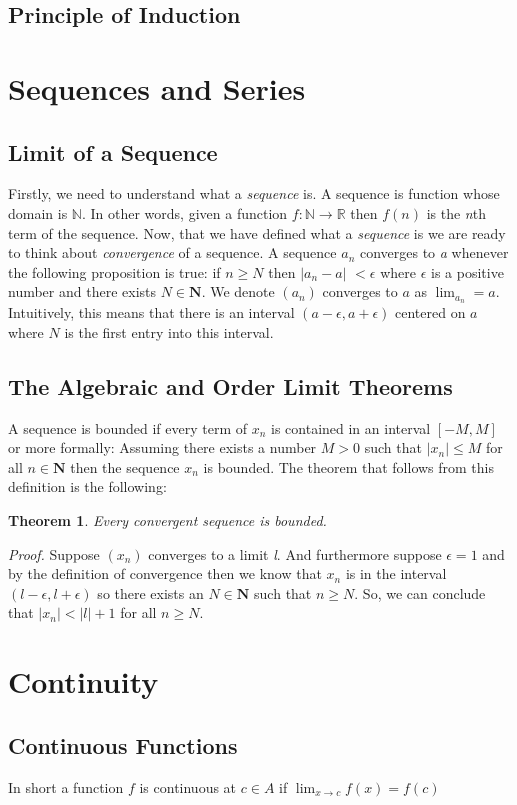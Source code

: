 \documentclass[10pt]{article}
\newtheorem{theorem}{Theorem}
\begin{document}
\subsection{Principle of Induction}

\section{Sequences and Series}

\subsection{Limit of a Sequence}
Firstly, we need to understand what a \textit{sequence} is. A sequence is function whose domain is $\mathbb{N}$. In other words, given a function $f: \mathbb{N} \to \mathbb{R}$ then $f(n)$ is the \textit{n}th term of the sequence.
Now, that we have defined what a \textit{sequence} is  we are ready to think about \textit{convergence} of a sequence. A sequence $a_{n}$ converges to \textit{a} whenever the following proposition is true: if $n \ge N$ then $\left|a_{n}-a\right|$ $< \epsilon$ where $\epsilon$ is a positive number and there exists $N \in \mathbf{N}$. We denote $\left(a_{n}\right)$ converges to $a$ as $\lim_{a_{n}} = a$. Intuitively, this means that there is an interval $\left(a-\epsilon, a+\epsilon\right)$ centered on $a$ where $N$ is the first entry into this interval.

\subsection{The Algebraic and Order Limit Theorems}
A sequence is bounded if every term of $x_{n}$ is contained in an interval $\left[-M, M\right]$ or more formally: Assuming there exists a number $M > 0$ such that $\left|x_{n}\right| \le M$ for all $n \in \mathbf{N}$ then the sequence $x_{n}$ is bounded. The theorem that follows from this definition is the following: 
\begin{theorem}
\textit{Every convergent sequence is bounded.}
\end{theorem}
\textit{Proof.} Suppose $\left(x_{n}\right)$ converges to a limit \textit{l}. And furthermore suppose $\epsilon = 1$ and by the definition of convergence then we know that $x_{n}$ is in the interval 
$\left(l-\epsilon, l+\epsilon\right)$ so there exists an $N \in \mathbf{N}$ such that $n \ge N$. So, we can conclude that $\left|x_{n}\right| < \left|l\right| + 1$ for all $n \ge N$.

\section{Continuity}
\subsection{Continuous Functions}
In short  a function $f$ is continuous at $c \in A$ if $\lim_{x\to c} f\left(x\right) = f\left(c\right)$
\end{document}
